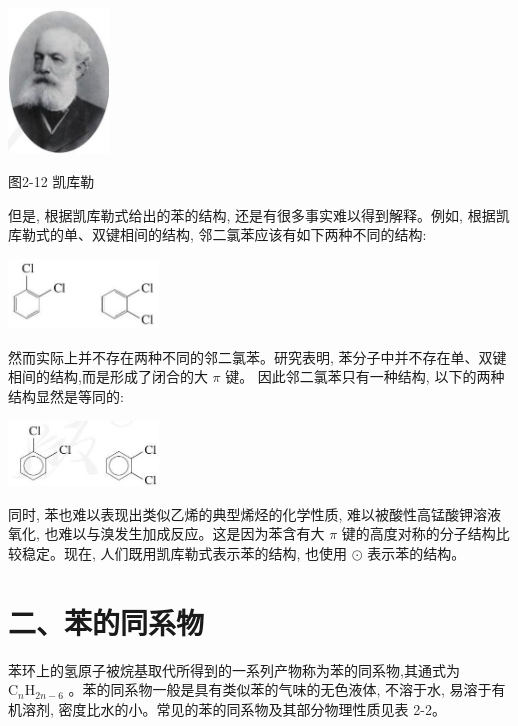 \documentclass[10pt]{article}
\begin{document}
\begin{center}
\includegraphics[max width=0.2\textwidth]{images/0190efc5-b58a-7c43-bfb0-e0a030df9cfd_50_521411.jpg}
\end{center}

图2-12 凯库勒

但是, 根据凯库勒式给出的苯的结构, 还是有很多事实难以得到解释。例如, 根据凯库勒式的单、双键相间的结构, 邻二氯苯应该有如下两种不同的结构:

\begin{center}
\includegraphics[max width=0.3\textwidth]{images/0190efc5-b58a-7c43-bfb0-e0a030df9cfd_50_457016.jpg}
\end{center}

然而实际上并不存在两种不同的邻二氯苯。研究表明, 苯分子中并不存在单、双键相间的结构,而是形成了闭合的大 \(\pi\) 键。 因此邻二氯苯只有一种结构, 以下的两种结构显然是等同的:

\begin{center}
\includegraphics[max width=0.3\textwidth]{images/0190efc5-b58a-7c43-bfb0-e0a030df9cfd_50_965297.jpg}
\end{center}

同时, 苯也难以表现出类似乙烯的典型烯烃的化学性质, 难以被酸性高锰酸钾溶液氧化, 也难以与溴发生加成反应。这是因为苯含有大 \(\pi\) 键的高度对称的分子结构比较稳定。现在, 人们既用凯库勒式表示苯的结构, 也使用 \(\odot\) 表示苯的结构。

\section*{二、苯的同系物}

苯环上的氢原子被烷基取代所得到的一系列产物称为苯的同系物,其通式为 \({\mathrm{C}}_{n}{\mathrm{H}}_{{2n} - 6}\) 。苯的同系物一般是具有类似苯的气味的无色液体, 不溶于水, 易溶于有机溶剂, 密度比水的小。常见的苯的同系物及其部分物理性质见表 2-2。
\end{document}
